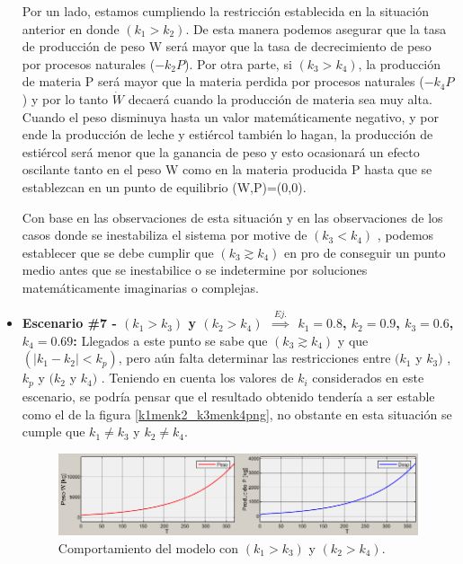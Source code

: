 \begin{itemize}
    Por un lado, estamos cumpliendo la restricción establecida en la situación anterior en donde $(k_{1} > k_{2})$. De esta manera podemos asegurar que la tasa de producción de peso W será mayor que la tasa de decrecimiento de peso por procesos naturales ($-k_{2}P$). Por otra parte, si $(k_{3} > k_{4})$, la producción de materia P será mayor que la materia perdida por procesos naturales ($-k_{4}P$) y por lo tanto $\dot{W}$ decaerá cuando la producción de materia sea muy alta. Cuando el peso disminuya hasta un valor matemáticamente negativo, y por ende la producción de leche y estiércol también lo hagan, la producción de estiércol será menor que la ganancia de peso y esto ocasionará un efecto oscilante tanto en el peso W como en la materia producida P hasta que se establezcan en un punto de equilibrio (W,P)=(0,0).
    
    Con base en las observaciones de esta situación y en las observaciones de los casos donde se inestabiliza el sistema por motive de $(k_{3} < k_{4})$ , podemos establecer que se debe cumplir que $(k_{3} \gtrsim k_{4})$ en pro de conseguir un punto medio antes que se inestabilice o se indetermine por soluciones matemáticamente imaginarias o complejas.
        
    \item \textbf{Escenario \#7 - $(k_{1}>k_{3})$ y $(k_{2}>k_{4})$ $\overset{Ej.}{\implies}$ $k_{1}=0.8$, $k_{2}=0.9$, $k_{3}=0.6$, $k_{4}=0.69$:} Llegados a este punto se sabe que $(k_{3} \gtrsim k_{4})$ y que $(|k_{1} - k_{2}| < k_{p})$, pero aún falta determinar las restricciones entre $(k_{1}$ y $k_{3})$ ,$k_{p}$ y $(k_{2}$ y $k_{4})$ . Teniendo en cuenta los valores de $k_{i}$ considerados en este escenario, se podría pensar que el resultado obtenido tendería a ser estable como el de la figura \ref{k1menk2_k3menk4png}, no obstante en esta situación se cumple que $k_{1} \neq k_{3}$ y $k_{2} \neq k_{4}$. 
    
            \begin{figure}[H]
        	 \centering
        	 \includegraphics[scale=0.75]{img/k1Mk3_k2Mk4.png}
        	 \caption{Comportamiento del modelo con $(k_{1}>k_{3})$ y $(k_{2}>k_{4})$. \label{k1Mk3_k2Mk4png}}
        \end{figure}


\end{itemize}
